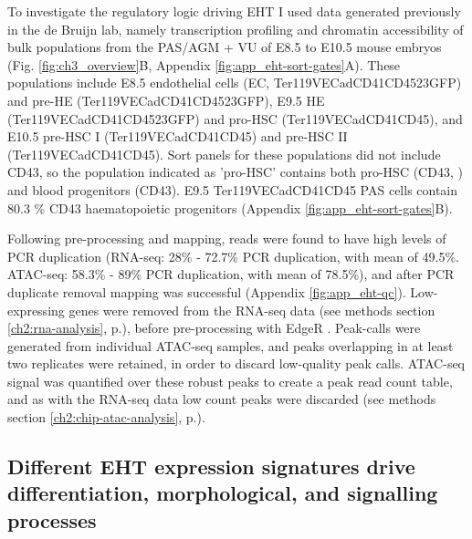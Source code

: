 To investigate the regulatory logic driving EHT I used data generated previously in the de Bruijn lab, namely transcription profiling and chromatin accessibility of bulk populations from the PAS/AGM + VU of E8.5 to E10.5 mouse embryos (Fig. \ref{fig:ch3_overview}B, Appendix \ref{fig:app_eht-sort-gates}A). These populations include E8.5 endothelial cells (EC, Ter119\uneg{}VECad\upos{}CD41\uneg{}CD45\uneg{}23GFP\uneg{}) and pre-HE (Ter119\uneg{}VECad\upos{}CD41\uneg{}CD45\uneg{}23GFP\upos{}), E9.5 HE (Ter119\uneg{}VECad\upos{}\-CD41\uneg{}CD45\uneg{}23GFP\upos{}) and pro-HSC (Ter119\uneg{}VECad\upos{}CD41\upos{}CD45\uneg{}), and E10.5 pre-HSC I (Ter119\uneg{}VECad\upos{}\-CD41\upos{}CD45\uneg{}) and pre-HSC II (Ter119\uneg{}VECad\upos{}CD41\upos{}CD45\upos{}). Sort panels for these populations did not include CD43, so the population indicated as 'pro-HSC' contains both pro-HSC (CD43\uneg{}, \cite{rybtsov_tracing_2014}) and blood progenitors (CD43\upos{}). E9.5 Ter119\uneg{}VECad\upos{}CD41\upos{}CD45\uneg{} PAS cells contain 80.3 \% CD43\upos{} haematopoietic progenitors (Appendix \ref{fig:app_eht-sort-gates}B).

Following pre-processing and mapping, reads were found to have high levels of PCR duplication (RNA-seq: 28\% - 72.7\% PCR duplication, with mean of 49.5\%. ATAC-seq: 58.3\% - 89\% PCR duplication, with mean of 78.5\%), and after PCR duplicate removal mapping was successful (Appendix \ref{fig:app_eht-qc}). Low-expressing genes were removed from the RNA-seq data (see methods section \ref{ch2:rna-analysis}, p.\pageref{ch2:rna-analysis}), before pre-processing with EdgeR \citep{robinson_edger:_2010}. Peak-calls were generated from individual ATAC-seq samples, and peaks overlapping in at least two replicates were retained, in order to discard low-quality peak calls. ATAC-seq signal was quantified over these robust peaks to create a peak read count table, and as with the RNA-seq data low count peaks were discarded (see methods section \ref{ch2:chip-atac-analysis}, p.\pageref{ch2:chip-atac-analysis}). 

\subsection[Different EHT expression signatures drive differentiation, morphological, and signalling processes]{\label{ch3:profiling}Different EHT expression signatures drive\\differentiation, morphological, and signalling\\processes}

